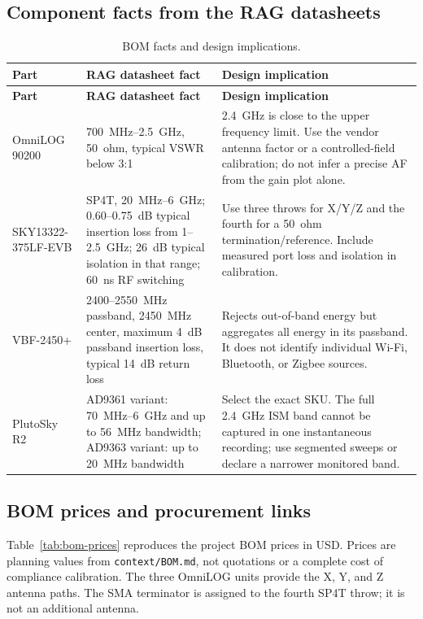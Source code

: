 \documentclass[11pt,a4paper]{article}
\begin{document}
\subsection{Component facts from the RAG datasheets}
\begin{longtable}{L{0.23\textwidth}L{0.27\textwidth}L{0.42\textwidth}}
\caption{BOM facts and design implications.}\\
\toprule
\textbf{Part} & \textbf{RAG datasheet fact} & \textbf{Design implication}\\
\midrule
\endfirsthead
\toprule
\textbf{Part} & \textbf{RAG datasheet fact} & \textbf{Design implication}\\
\midrule
\endhead
OmniLOG 90200 & 700~MHz--2.5~GHz, 50~ohm, typical VSWR below 3:1 \cite{OmniLOG-90200} & 2.4~GHz is close to the upper frequency limit. Use the vendor antenna factor or a controlled-field calibration; do not infer a precise AF from the gain plot alone.\\
SKY13322-375LF-EVB & SP4T, 20~MHz--6~GHz; 0.60--0.75~dB typical insertion loss from 1--2.5~GHz; 26~dB typical isolation in that range; 60~ns RF switching \cite{SKY13322-375LF-EVB} & Use three throws for X/Y/Z and the fourth for a 50~ohm termination/reference. Include measured port loss and isolation in calibration.\\
VBF-2450+ & 2400--2550~MHz passband, 2450~MHz center, maximum 4~dB passband insertion loss, typical 14~dB return loss \cite{VBF-2450} & Rejects out-of-band energy but aggregates all energy in its passband. It does not identify individual Wi-Fi, Bluetooth, or Zigbee sources.\\
PlutoSky R2 & AD9361 variant: 70~MHz--6~GHz and up to 56~MHz bandwidth; AD9363 variant: up to 20~MHz bandwidth \cite{PlutoSky-R2} & Select the exact SKU. The full 2.4~GHz ISM band cannot be captured in one instantaneous recording; use segmented sweeps or declare a narrower monitored band.\\
\bottomrule
\end{longtable}

\subsection{BOM prices and procurement links}
Table~\ref{tab:bom-prices} reproduces the project BOM prices in USD. Prices are planning values from \texttt{context/BOM.md}, not quotations or a complete cost of compliance calibration. The three OmniLOG units provide the X, Y, and Z antenna paths. The SMA terminator is assigned to the fourth SP4T throw; it is not an additional antenna.
\end{document}

